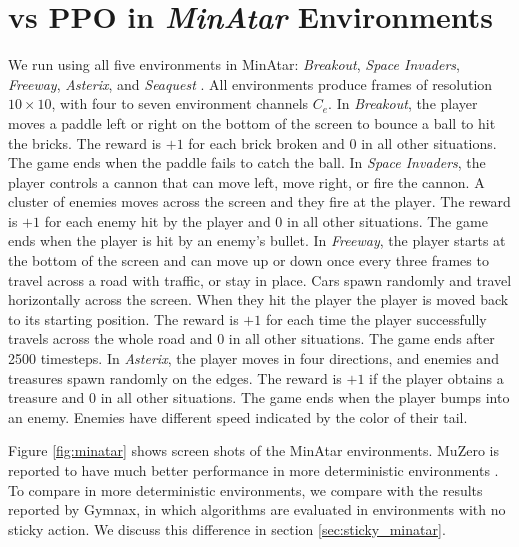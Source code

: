 \section{\moozi vs PPO in \textit{MinAtar} Environments} \label{sec:exp:minatar}
We run \moozi using all five environments in MinAtar: \textit{Breakout}, \textit{Space Invaders}, \textit{Freeway}, \textit{Asterix}, and \textit{Seaquest} \cite{MinAtarAtariInspiredTestbed_Young.Tian_2019}.
All environments produce frames of resolution $10 \times 10$, with four to seven environment channels $C_e$.
In \textit{Breakout}, the player moves a paddle left or right on the bottom of the screen to bounce a ball to hit the bricks.
The reward is $+1$ for each brick broken and $0$ in all other situations.
The game ends when the paddle fails to catch the ball.
In \textit{Space Invaders}, the player controls a cannon that can move left, move right, or fire the cannon.
A cluster of enemies moves across the screen and they fire at the player.
The reward is $+1$ for each enemy hit by the player and $0$ in all other situations.
The game ends when the player is hit by an enemy's bullet.
In \textit{Freeway}, the player starts at the bottom of the screen and can move up or down once every three frames to travel across a road with traffic, or stay in place.
Cars spawn randomly and travel horizontally across the screen.
When they hit the player the player is moved back to its starting position.
The reward is $+1$ for each time the player successfully travels across the whole road and $0$ in all other situations.
The game ends after 2500 timesteps.
In \textit{Asterix}, the player moves in four directions, and enemies and treasures spawn randomly on the edges.
The reward is $+1$ if the player obtains a treasure and $0$ in all other situations.
The game ends when the player bumps into an enemy.
Enemies have different speed indicated by the color of their tail.

Figure \ref{fig:minatar} shows screen shots of the MinAtar environments.
MuZero is reported to have much better performance in more deterministic environments \cite{VectorQuantizedModels_Ozair.Li.ea_2021}.
To compare \moozi in more deterministic environments, we compare with the results reported by Gymnax, in which algorithms are evaluated in environments with no sticky action.
We discuss this difference in section \ref{sec:sticky_minatar}.


